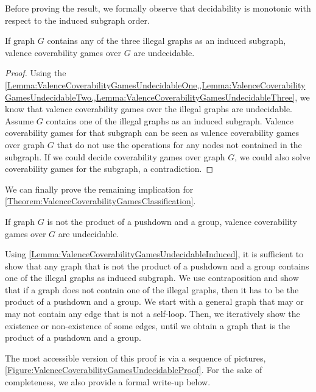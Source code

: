 \documentclass[../../diss.tex]{subfiles}
\begin{document}
Before proving the result, we formally observe that decidability is monotonic with respect to the induced subgraph order.

\begin{lemma}%
\label{Lemma:ValenceCoverabilityGamesUndecidableInduced}%
    If graph $G$ contains any of the three illegal graphs as an induced subgraph, valence coverability games over $G$ are undecidable.
\end{lemma}

\begin{proof}
    Using the \cref{Lemma:ValenceCoverabilityGamesUndecidableOne,,Lemma:ValenceCoverabilityGamesUndecidableTwo,,Lemma:ValenceCoverabilityGamesUndecidableThree}, we know that valence coverability games over the illegal graphs are undecidable.
    Assume $G$ contains one of the illegal graphs as an induced subgraph.
    Valence coverability games for that subgraph can be seen as valence coverability games over graph $G$ that do not use the operations for any nodes not contained in the subgraph.
    If we could decide coverability games over graph $G$, we could also solve coverability games for the subgraph, a contradiction.
\end{proof}

We can finally prove the remaining implication for \cref{Theorem:ValenceCoverabilityGamesClassification}.

\begin{proposition}%
\label{Proposition:ValenceCoverabilityGamesUndecidable}
    If graph $G$ is not the product of a pushdown and a group, valence coverability games over $G$ are undecidable.
\end{proposition}

Using \cref{Lemma:ValenceCoverabilityGamesUndecidableInduced}, it is sufficient to show that any graph that is not the product of a pushdown and a group contains one of the illegal graphs as induced subgraph.
We use contraposition and show that if a graph does not contain one of the illegal graphs, then it has to be the product of a pushdown and a group.
We start with a general graph that may or may not contain any edge that is not a self-loop.
Then, we iteratively show the existence or non-existence of some edges, until we obtain a graph that is the product of a pushdown and a group.

The most accessible version of this proof is via a sequence of pictures, \cref{Figure:ValenceCoverabilityGamesUndecidableProof}.
For the sake of completeness, we also provide a formal write-up below.
\end{document}
